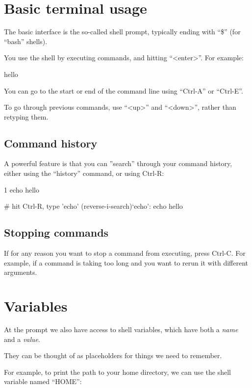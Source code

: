 \section{Basic terminal usage}

The basic interface is the so-called shell prompt, typically ending with ``\$''
(for ``bash'' shells).

You use the shell by executing commands, and hitting ``<enter>''. For example:

\begin{prompt}
hello
\end{prompt}

You can go to the start or end of the command line using ``Ctrl-A'' or ``Ctrl-E''.

To go through previous commands, use ``<up>'' and ``<down>'', rather than retyping them.

\subsection{Command history}

A powerful feature is that you can ''search'' through your command history, either using the ``history'' command, or using Ctrl-R:

\begin{prompt}
    1  echo hello

# hit Ctrl-R, type 'echo'
(reverse-i-search)`echo': echo hello
\end{prompt}

\subsection{Stopping commands}
If for any reason you want to stop a command from executing, press Ctrl-C. For
example, if a command is taking too long and you want to rerun it with different arguments.

\section{Variables}

At the prompt we also have access to shell variables, which have both a \emph{name} and a \emph{value}.

They can be thought of as placeholders for things we need to remember.

For example, to print the path to your home directory, we can use the shell variable named ``HOME'':

